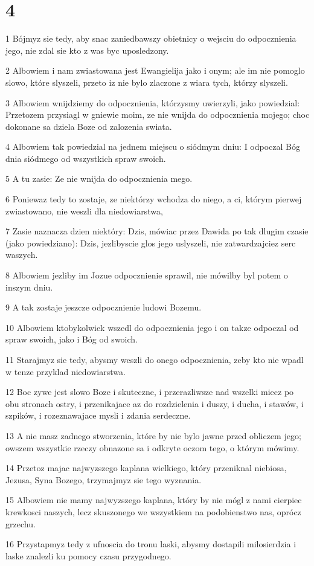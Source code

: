 \chapter{4}

\par 1 Bójmyz sie tedy, aby snac zaniedbawszy obietnicy o wejsciu do odpocznienia jego, nie zdal sie kto z was byc uposledzony.
\par 2 Albowiem i nam zwiastowana jest Ewangielija jako i onym; ale im nie pomoglo slowo, które slyszeli, przeto iz nie bylo zlaczone z wiara tych, którzy slyszeli.
\par 3 Albowiem wnijdziemy do odpocznienia, którzysmy uwierzyli, jako powiedzial: Przetozem przysiagl w gniewie moim, ze nie wnijda do odpocznienia mojego; choc dokonane sa dziela Boze od zalozenia swiata.
\par 4 Albowiem tak powiedzial na jednem miejscu o siódmym dniu: I odpoczal Bóg dnia siódmego od wszystkich spraw swoich.
\par 5 A tu zasie: Ze nie wnijda do odpocznienia mego.
\par 6 Poniewaz tedy to zostaje, ze niektórzy wchodza do niego, a ci, którym pierwej zwiastowano, nie weszli dla niedowiarstwa,
\par 7 Zasie naznacza dzien niektóry: Dzis, mówiac przez Dawida po tak dlugim czasie (jako powiedziano): Dzis, jezlibyscie glos jego uslyszeli, nie zatwardzajciez serc waszych.
\par 8 Albowiem jezliby im Jozue odpocznienie sprawil, nie mówilby byl potem o inszym dniu.
\par 9 A tak zostaje jeszcze odpocznienie ludowi Bozemu.
\par 10 Albowiem ktobykolwiek wszedl do odpocznienia jego i on takze odpoczal od spraw swoich, jako i Bóg od swoich.
\par 11 Starajmyz sie tedy, abysmy weszli do onego odpocznienia, zeby kto nie wpadl w tenze przyklad niedowiarstwa.
\par 12 Boc zywe jest slowo Boze i skuteczne, i przerazliwsze nad wszelki miecz po obu stronach ostry, i przenikajace az do rozdzielenia i duszy, i ducha, i stawów, i szpików, i rozeznawajace mysli i zdania serdeczne.
\par 13 A nie masz zadnego stworzenia, które by nie bylo jawne przed obliczem jego; owszem wszystkie rzeczy obnazone sa i odkryte oczom tego, o którym mówimy.
\par 14 Przetoz majac najwyzszego kaplana wielkiego, który przeniknal niebiosa, Jezusa, Syna Bozego, trzymajmyz sie tego wyznania.
\par 15 Albowiem nie mamy najwyzszego kaplana, który by nie mógl z nami cierpiec krewkosci naszych, lecz skuszonego we wszystkiem na podobienstwo nas, oprócz grzechu.
\par 16 Przystapmyz tedy z ufnoscia do tronu laski, abysmy dostapili milosierdzia i laske znalezli ku pomocy czasu przygodnego.

